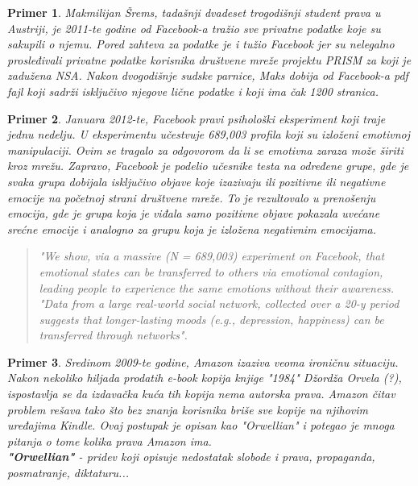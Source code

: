 \documentclass[a4paper]{article}
\newtheorem{primer}{Primer}[section]
\begin{document}
\begin{primer}
	Makmilijan Šrems, tadašnji dvadeset trogodišnji student prava u
Austriji, je 2011-te godine od Facebook-a tražio sve privatne podatke koje su sakupili o njemu. Pored zahteva za podatke je i tužio Facebook jer su nelegalno prosleđivali privatne podatke korisnika društvene mreže projektu PRISM\cite{noPlaceToHide} za koji je zadužena NSA. Nakon dvogodišnje sudske parnice, Maks dobija od Facebook-a pdf fajl koji sadrži isključivo njegove lične podatke i koji ima čak 1200 stranica. \cite{marxSchremsFT}
\end{primer}

\begin{primer}
	Januara 2012-te, Facebook pravi psihološki eksperiment koji 
traje jednu nedelju. U eksperimentu učestvuje 689,003 profila koji su izloženi emotivnoj manipulaciji. Ovim se tragalo za odgovorom da li se emotivna zaraza može širiti kroz mrežu. Zapravo, Facebook je podelio učesnike testa na određene grupe, gde je svaka grupa dobijala isključivo objave koje izazivaju ili pozitivne ili negativne emocije na početnoj strani društvene mreže. To je rezultovalo u prenošenju emocija, gde je grupa koja je viđala samo pozitivne objave pokazala uvećane srećne emocije i analogno 	za grupu koja je izložena negativnim emocijama. \cite{facebookExperiment}
\begin{quotation}
	\textit{"We show, via a massive (N = 689,003) experiment on Facebook, that emotional states can be transferred to others via emotional contagion, leading people to experience the same emotions without their awareness.
"Data from a large real-world social network, collected over a 20-y period suggests that longer-lasting moods (e.g., depression, happiness) can be transferred through networks". \cite{facebookExperiment}}\\
\end{quotation}
\end{primer}

\begin{primer}
	Sredinom 2009-te godine, Amazon izaziva veoma ironičnu 
situaciju. Nakon nekoliko hiljada prodatih e-book kopija knjige "1984" Džordža Orvela (?), ispostavlja se da izdavačka kuća tih kopija nema autorska prava. Amazon čitav problem rešava tako što bez znanja korisnika briše sve kopije na njihovim uređajima Kindle. Ovaj postupak je opisan kao "Orwellian" i potegao je mnoga pitanja o tome kolika prava Amazon ima. \cite{dataAndGoliath}\\

\textbf{"Orwellian"} - \textit{pridev koji opisuje nedostatak slobode i prava, propaganda, posmatranje, diktaturu...}\\
\end{primer}
\end{document}
